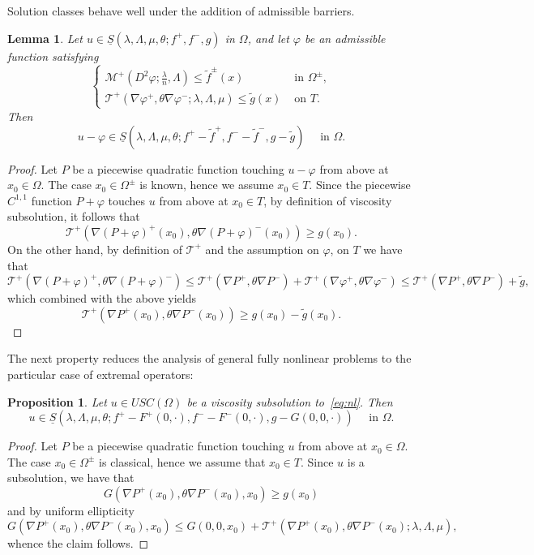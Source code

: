 \documentclass[letter,11pt]{amsart}
\newcommand{\mcal}{\mathcal{M}}
\newcommand{\tcal}{\mathcal{T}}
\newcommand{\uppers}{USC}
\newtheorem{prop}[thm]{Proposition}
\newtheorem{lem}[thm]{Lemma}
\theoremstyle{definition}
\numberwithin{equation}{section}
\begin{document}
\medskip

Solution classes behave well under the addition of admissible barriers.

\begin{lem}
\label{lem:aux}
Let $u \in \underline{S}(\lambda,\Lambda,\mu,\theta; f^{+}, f^{-}, g)$ in $\Omega$, and let $\varphi$ be an admissible function satisfying
\[
\begin{cases}
\mcal^{+}(D^2 \varphi; \frac{\lambda}{n}, \Lambda) \leq \widetilde{f}^{\pm}(x) & \text{ in } \Omega^{\pm},\\
\tcal^{+}(\nabla \varphi^{+}, \theta \nabla \varphi^{-}; \lambda, \Lambda, \mu) \leq \widetilde{g}(x) & \text{ on } T.
\end{cases}
\]
Then
\[
u - \varphi \in \underline{S}(\lambda,\Lambda,\mu,\theta; f^{+}- \widetilde{f}^{+}, f^{-}- \widetilde{f}^{-}, g - \widetilde{g}) \quad \text{ in } \Omega.
\]
\end{lem}
\begin{proof}
Let $P$ be a piecewise quadratic function touching $u- \varphi$ from above at $x_0 \in \Omega$.
The case $x_0 \in \Omega^{\pm}$ is known, hence we assume $x_0 \in T$.
Since the piecewise $C^{1,1}$ function $P + \varphi$ touches $u$ from above at $x_0 \in T$, by definition of viscosity subsolution, it follows that
\[
\tcal^{+}( \nabla (P + \varphi)^{+}(x_0), \theta \nabla (P + \varphi)^{-}(x_0)) \geq g(x_0).
\]
On the other hand, by definition of $\tcal^{+}$ and the assumption on $\varphi$, on $T$ we have that
\[
\tcal^{+}(\nabla (P + \varphi)^{+}, \theta \nabla (P + \varphi)^{-}) 
\leq \tcal^{+}(\nabla P^{+}, \theta \nabla P^{-}) + \tcal^{+}(\nabla \varphi^{+},\theta \nabla \varphi^{-}) 
\leq \tcal^{+}(\nabla P^{+},\theta \nabla P^{-}) + \widetilde{g},
\]
which combined with the above yields
\[
\tcal^{+}(\nabla P^{+}(x_0), \theta \nabla P^{-}(x_0)) \geq g (x_0) - \widetilde{g}(x_0).
\]
\end{proof}

\medskip

The next property reduces the analysis of general fully nonlinear problems to the particular case of extremal operators:

\begin{prop}
Let $u \in \uppers(\Omega)$ be a viscosity subsolution to~\eqref{eq:nl}.
Then
\[
u \in \underline{S}\left(
\lambda,\Lambda,\mu,\theta; 
f^{+} - F^{+}(0,\cdot), f^{-} - F^{-}(0,\cdot), g - G(0,0, \cdot)
\right) \quad \text{ in } \Omega.
\]
\end{prop}
\begin{proof}
Let $P$ be a piecewise quadratic function touching $u$ from above at $x_0 \in \Omega$.
The case $x_0 \in \Omega^{\pm}$ is classical, hence we assume that $x_0 \in T$.
Since $u$ is a subsolution, we have that
\[
G(\nabla P^{+}(x_0), \theta \nabla P^{-}(x_0), x_0) \geq g (x_0)
\]
and by uniform ellipticity
\[
G(\nabla P^{+}(x_0), \theta \nabla P^{-}(x_0), x_0) \leq G(0, 0, x_0) + \tcal^{+}(\nabla P^{+}(x_0), \theta \nabla P^{-}(x_0); \lambda, \Lambda, \mu),
\]
whence the claim follows.
\end{proof}
\end{document}
